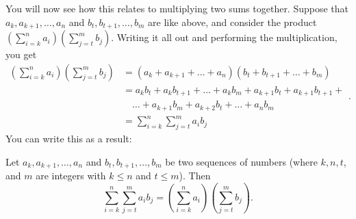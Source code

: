 \documentclass[
  12pt,
  a4paper, oneside]{starmastarticle}
\begin{document}
You will now see how this relates to multiplying two sums together.
Suppose that \(a_k,a_{k+1},\ldots,a_n\) and \(b_t,b_{t+1},\ldots,b_m\)
are like above, and consider the product
\((\sum_{i=k}^na_i)(\sum_{j=t}^mb_j)\). Writing it all out and
performing the multiplication, you get
\[\begin{equation}\begin{split} (\sum_{i=k}^na_i)(\sum_{j=t}^mb_j) &= (a_k+a_{k+1}+\ldots+a_n)(b_t + b_{t+1}+\ldots+b_m) \\ &= a_kb_t + a_kb_{t+1} + \ldots + a_kb_m + a_{k+1}b_t + a_{k+1}b_{t+1} + \\ & \quad \ldots + a_{k+1}b_m + a_{k+2}b_t + \ldots + a_nb_m \\ &= \sum_{i=k}^n\sum_{j=t}^m a_i b_j\end{split}.\end{equation}\]
You can write this as a result:

\begin{tcolorbox}[enhanced jigsaw, colframe=quarto-callout-note-color-frame, coltitle=black, left=2mm, opacityback=0, breakable, colbacktitle=quarto-callout-note-color!10!white, bottomtitle=1mm, toptitle=1mm, titlerule=0mm, title=\textcolor{quarto-callout-note-color}{\faInfo}\hspace{0.5em}{Double sums and products of two sums}, toprule=.15mm, rightrule=.15mm, bottomrule=.15mm, arc=.35mm, leftrule=.75mm, opacitybacktitle=0.6, colback=white]
Let \(a_{k},a_{k+1},\ldots,a_n\) and \(b_t,b_{t+1},\ldots,b_m\) be two
sequences of numbers (where \(k,n,t\), and \(m\) are integers with
\(k \leq n\) and \(t \leq m\)). Then
\[\sum_{i=k}^n\sum_{j=t}^m a_i b_j = (\sum_{i=k}^na_i)(\sum_{j=t}^mb_j).\]
\end{tcolorbox}

\begin{tcolorbox}[enhanced jigsaw, arc=.35mm, colframe=quarto-callout-note-color-frame, rightrule=.15mm, bottomrule=.15mm, toprule=.15mm, leftrule=.75mm, left=2mm, opacityback=0, colback=white, breakable]
\begin{minipage}[t]{5.5mm}
\textcolor{quarto-callout-note-color}{\faInfo}
\end{minipage}%
\begin{minipage}[t]{\textwidth - 5.5mm}

\end{minipage}%
\end{tcolorbox}
\end{document}
